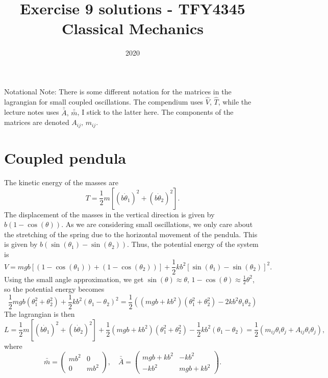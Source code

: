 \documentclass{article}
\title{Exercise 9 solutions - TFY4345 Classical Mechanics}
\date{2020}
\begin{document}
    \maketitle
    Notational Note: There is some different notation for the matrices in the lagrangian for small coupled oscillations. The compendium uses $\hat V, \, \hat T$, while the lecture notes uses $\bar {\bar A}, \, \bar {\bar m}$, I stick to the latter here. The components of the matrices are denoted $A_{ij}, \, m_{ij}$.
    \section{Coupled pendula}
        The kinetic energy of the masses are 
        \begin{equation*}
            T = \frac{1}{2}m\left[(b \dot \theta_1)^2 + (b \dot \theta_2)^2\right].
        \end{equation*}
        The displacement of the masses in the vertical direction is given by $b(1 - \cos(\theta))$. As we are considering small oscillations, we only care about the stretching of the spring due to the horizontal movement of the pendula. This is given by $b (\sin(\theta_1) - \sin(\theta_2))$. Thus, the potential energy of the system is
        \begin{equation*}
            V = mgb\left[(1 - \cos(\theta_1)) + (1 - \cos(\theta_2))\right] + \frac{1}{2}kb^2\left[\sin(\theta_1) - \sin(\theta_2)\right]^2.
        \end{equation*}
        Using the small angle approximation, we get $\sin(\theta) \approx \theta$, $1 - \cos(\theta) \approx \frac{1}{2} \theta^2$, so the potential energy becomes
        \begin{equation*}
            \frac{1}{2} mgb (\theta_1^2 + \theta_2^2) + \frac{1}{2}kb^2(\theta_1 - \theta_2)^2 = \frac{1}{2}\left((mgb + kb^2)(\theta_1^2 + \theta_2^2) - 2kb^2 \theta_1 \theta_2\right)
        \end{equation*}
        The lagrangian is then
        \begin{equation*}
            L = \frac{1}{2}m\left[(b \dot \theta_1)^2 + (b \dot \theta_2)^2\right] + \frac{1}{2} (mgb + kb^2) (\theta_1^2 + \theta_2^2) - \frac{1}{2}kb^2(\theta_1 - \theta_2)  = \frac{1}{2}\left(m_{ij}\theta_i \theta_j + A_{ij}\theta_i \theta_j\right),
        \end{equation*}
        where
        \begin{equation*}
            \bar {\bar m} = 
            \begin{pmatrix*}
                mb^2 & 0 \\
                0 & mb^2
            \end{pmatrix*}
            , \quad \bar {\bar A} = 
            \begin{pmatrix}
                mgb + kb^2 & -kb^2 \\
                -kb^2 & mgb + kb^2
            \end{pmatrix}.
        \end{equation*}
\end{document}
